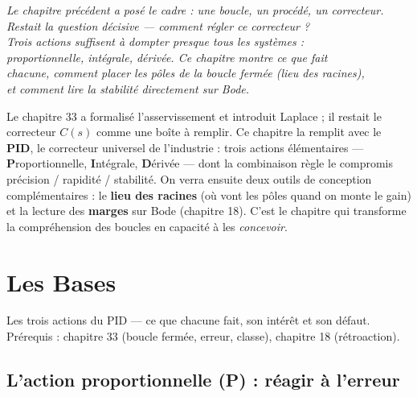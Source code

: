 \documentclass[12pt,a4paper,twoside]{book}
\begin{document}
\begin{center}
\textit{Le chapitre précédent a posé le cadre : une boucle, un procédé, un correcteur.\\
Restait la question décisive --- comment régler ce correcteur ?\\
Trois actions suffisent à dompter presque tous les systèmes :\\
proportionnelle, intégrale, dérivée. Ce chapitre montre ce que fait\\
chacune, comment placer les pôles de la boucle fermée (lieu des racines),\\
et comment lire la stabilité directement sur Bode.}
\end{center}

\vspace{0.5cm}

Le chapitre 33 a formalisé l'asservissement et introduit Laplace ; il restait le correcteur $C(s)$ comme une boîte à remplir. Ce chapitre la remplit avec le \textbf{PID}, le correcteur universel de l'industrie : trois actions élémentaires --- \textbf{P}roportionnelle, \textbf{I}ntégrale, \textbf{D}érivée --- dont la combinaison règle le compromis précision / rapidité / stabilité. On verra ensuite deux outils de conception complémentaires : le \textbf{lieu des racines} (où vont les pôles quand on monte le gain) et la lecture des \textbf{marges} sur Bode (chapitre 18). C'est le chapitre qui transforme la compréhension des boucles en capacité à les \textit{concevoir}.

\section{Les Bases}

\begin{bases}
Les trois actions du PID --- ce que chacune fait, son intérêt et son défaut. Prérequis : chapitre 33 (boucle fermée, erreur, classe), chapitre 18 (rétroaction).
\end{bases}

\subsection{L'action proportionnelle (P) : réagir à l'erreur}
\end{document}
